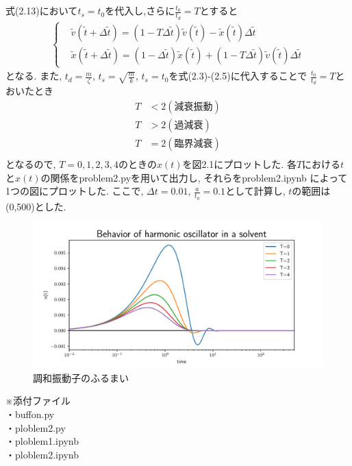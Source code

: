 \documentclass[a4paper,dvipdfmx]{jarticle}
\begin{document}
\subsection{}
\noindent

式(2.13)において$t_s=t_0$を代入し,さらに$\frac{t_0}{t_d}=T$とすると
\begin{subequations}
    \begin{align}
    \left\{
        \begin{aligned}
        & \tilde{v}(\tilde{t} + \Delta \tilde{t}) = \left(1 - T \Delta \tilde{t} \right) \tilde{v}(\tilde{t})
        - \tilde{x}(\tilde{t}) \Delta \tilde{t}\\
        & \tilde{x}(\tilde{t} + \Delta \tilde{t}) = (1 - \Delta \tilde{t} ) \tilde{x}(\tilde{t}) 
        + \left(1 - T \Delta \tilde{t} \right) \tilde{v}(\tilde{t}) \Delta \tilde{t}
        \end{aligned}
    \right. \tag{2.14}
    \end{align}
\end{subequations}
となる.
また, $t_d = \frac{m}{\zeta}$, $t_s = \sqrt{\frac{m}{k}}$, $t_s=t_0$を式(2.3)-(2.5)に代入することで
$\frac{t_0}{t_d}=T$とおいたとき
\begin{align*}
    T & < 2　　 (減衰振動) \tag{2.3}\\
    T & > 2　　 (過減衰) \tag{2.4}\\
    T & = 2　　 (臨界減衰) \tag{2.5}\\
\end{align*}
となるので, $T=0, 1, 2, 3, 4$のときの$x(t)$を図2.1にプロットした.
各$T$における$t$と$x(t)$の関係をproblem2.pyを用いて出力し, それらをproblem2.ipynb
によって1つの図にプロットした. 
ここで, $\Delta t=0.01$, $\frac{a}{t_0}=0.1$として計算し, $t$の範囲は(0,500)とした. 

\begin{figure}[H]
    \centering
    \includegraphics[scale=0.6]{./problem_2/problem2.pdf}
    \caption{調和振動子のふるまい}
\end{figure}

\newpage
\noindent
※添付ファイル \\
・buffon.py \\
・ploblem2.py \\
・ploblem1.ipynb \\
・ploblem2.ipynb
\end{document}
